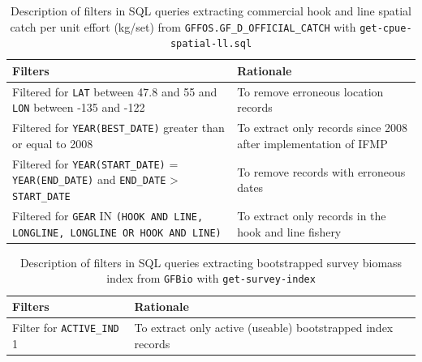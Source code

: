 \documentclass[11pt]{book}\usepackage[]{graphicx}\usepackage[]{color}
\begin{document}
\begin{table}[htpb]
\centering
\caption{Description of filters in SQL queries extracting commercial hook and line spatial catch per unit effort (kg/set) from \texttt{GFFOS.GF\_D\_OFFICIAL\_CATCH} with \texttt{get-cpue-spatial-ll.sql}}
\label{tab:sql-cpue-spatial-ll}
{\tabulinesep=1.6mm
\begin{tabu}{>{\raggedright\arraybackslash}m{2.8in}>{\raggedright\arraybackslash}m{3.2in}}
\toprule
Filters                                                                                                            & Rationale                                                                 \\
\midrule
Filtered for \texttt{LAT} between 47.8 and 55 and \texttt{LON} between -135 and -122                               & To remove erroneous location records                                      \\
Filtered for \texttt{YEAR(BEST\_DATE)} greater than or equal to 2008                                               & To extract only records since 2008 after implementation of IFMP           \\
Filtered for \texttt{YEAR(START\_DATE)} = \texttt{YEAR(END\_DATE)} and \texttt{END\_DATE} > \texttt{START\_DATE}   & To remove records with erroneous dates                                    \\
Filtered for \texttt{GEAR} IN \texttt{(HOOK AND LINE, LONGLINE, LONGLINE OR HOOK AND LINE)}                        & To extract only records in the hook and line fishery                      \\
\bottomrule
\end{tabu}}
\end{table}

\begin{table}[htp]
\centering
\caption{Description of filters in SQL queries extracting bootstrapped survey biomass index from \texttt{GFBio} with \texttt{get-survey-index}}
\label{tab:sql-survey-index}
{\tabulinesep=1.6mm
\begin{tabu}{>{\raggedright\arraybackslash}m{2.8in}>{\raggedright\arraybackslash}m{3.2in}}
\toprule
Filters                                                                                                            & Rationale                                                                \\
\midrule
Filter for \texttt{ACTIVE\_IND} 1                                                                                  & To extract only active (useable) bootstrapped index records              \\
\bottomrule
\end{tabu}}
\end{table}
\end{document}
